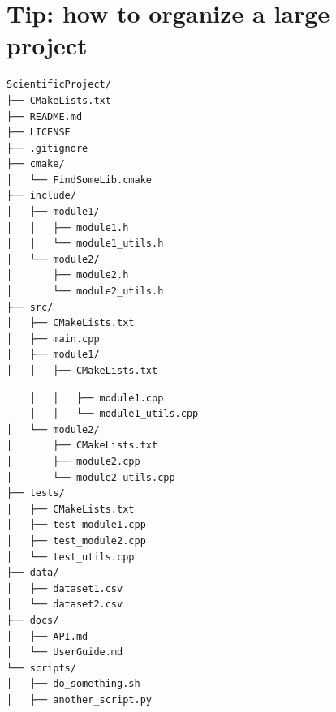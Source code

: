\documentclass[aspectratio=169,11pt]{beamer}
\begin{document}
\section{Tip: how to organize a large project}
\begin{frame}[fragile]
\small
\begin{minipage}[t]{.5\linewidth}
\begin{verbatim}
ScientificProject/
├── CMakeLists.txt
├── README.md
├── LICENSE
├── .gitignore
├── cmake/
│   └── FindSomeLib.cmake
├── include/
│   ├── module1/
│   │   ├── module1.h
│   │   └── module1_utils.h
│   └── module2/
│       ├── module2.h
│       └── module2_utils.h
├── src/
│   ├── CMakeLists.txt
│   ├── main.cpp
│   ├── module1/
│   │   ├── CMakeLists.txt
\end{verbatim}
\end{minipage}%
\begin{minipage}[t]{.5\linewidth}
\begin{verbatim}
	│   │   ├── module1.cpp
	│   │   └── module1_utils.cpp
│   └── module2/
│       ├── CMakeLists.txt
│       ├── module2.cpp
│       └── module2_utils.cpp
├── tests/
│   ├── CMakeLists.txt
│   ├── test_module1.cpp
│   ├── test_module2.cpp
│   └── test_utils.cpp
├── data/
│   ├── dataset1.csv
│   └── dataset2.csv
├── docs/
│   ├── API.md
│   └── UserGuide.md
└── scripts/
│   ├── do_something.sh
│   ├── another_script.py
\end{verbatim}
\end{minipage}
\end{frame}
\end{document}
